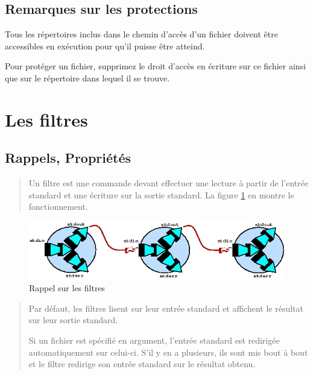 {%
\subsection{Remarques sur les protections}

Tous les r{\'e}pertoires inclus dans le chemin d'acc{\`e}s d'un fichier doivent
{\^e}tre accessibles en ex{\'e}cution pour qu'il  puisse {\^e}tre atteind.

Pour prot{\'e}ger un fichier, supprimez le droit d'acc{\`e}s en {\'e}criture sur ce
fichier ainsi que sur le r{\'e}pertoire dans lequel il se trouve.

\section{Les filtres}

\subsection{Rappels, Propri{\'e}t{\'e}s}

\begin{quote}
Un filtre est une commande devant effectuer une lecture {\`a} partir de
l'entr{\'e}e standard et une {\'e}criture sur la sortie standard. La figure
\ref{fig-cmds-rapp-filter} en montre le fonctionnement.
\end{quote}

\begin{figure}[hbtp]
\centering
\includegraphics{./_Images/cmds-unix/rapp-filter.jpg}
\caption{\label{fig-cmds-rapp-filter}Rappel sur les filtres}
\end{figure}

\begin{quote}
Par d{\'e}faut, les filtres lisent sur leur entr{\'e}e standard et affichent le
r{\'e}sultat sur leur sortie standard.

Si un fichier est sp{\'e}cifi{\'e} en argument, l'entr{\'e}e standard est redirig{\'e}e
automatiquement sur celui-ci. S'il y en a plusieurs, ils sont mis bout {\`a}
bout et le filtre redirige son entr{\'e}e standard sur le r{\'e}sultat obtenu.
\end{quote}

}
